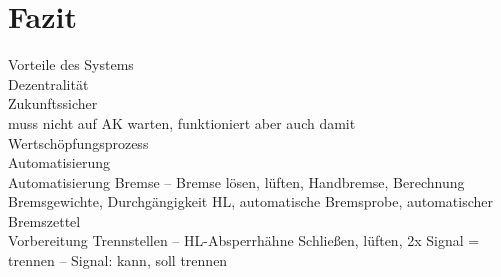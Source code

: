 \section{Fazit}
Vorteile des Systems\\
Dezentralität\\
Zukunftssicher\\
muss nicht auf AK warten, funktioniert aber auch damit\\
Wertschöpfungsprozess\\
Automatisierung\\
Automatisierung Bremse – Bremse lösen, lüften, Handbremse, Berechnung Bremsgewichte, Durchgängigkeit HL, automatische Bremsprobe, automatischer Bremszettel\\
Vorbereitung Trennstellen – HL-Absperrhähne Schließen, lüften, 2x Signal = trennen – Signal: kann, soll trennen\\